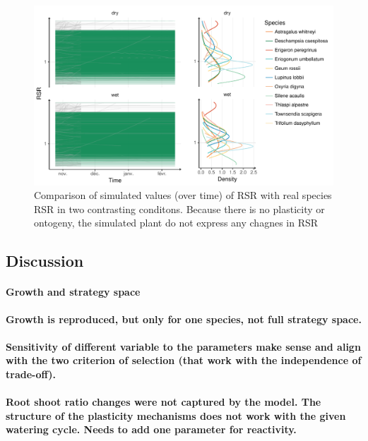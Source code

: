 \begin{figure}\label{fig:comparison_RSR}
\includegraphics[width = \textwidth]{./2_PP/Figures/RSR_full_sim.pdf}
\caption{Comparison of simulated values (over time) of RSR with real species RSR in two contrasting conditons. Because there is no plasticity or ontogeny, the simulated plant do not express any chagnes in RSR}
\end{figure}

\subsection{Discussion}

\paragraph{Growth and strategy space}

\textbf{Growth is reproduced, but only for one species, not full strategy space.}

\paragraph{}

\textbf{Sensitivity of different variable to the parameters make sense and align with the two criterion of selection (that work with the independence of trade-off).}

\paragraph{}

\textbf{Root shoot ratio changes were not captured by the model. The structure of the plasticity mechanisms does not work with the given watering cycle. Needs to add one parameter for reactivity.}


